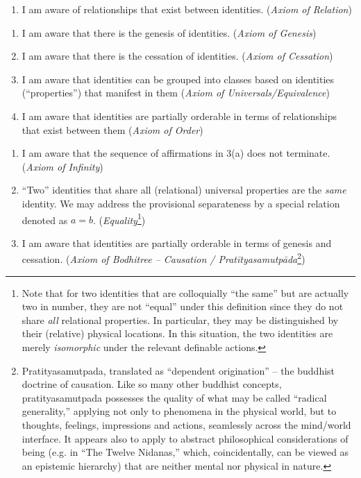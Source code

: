 \documentclass[pra,twocolumn,groupedaddress,10pt]{revtex4}
\theoremstyle{definition}
\begin{document}
\begin{enumerate}[label={[\textbf{\arabic*}]},start=0]
\begin{enumerate}
			\item I am aware of relationships that exist between identities. (\emph{Axiom of Relation})
		\end{enumerate}
	\item \begin {enumerate}
			\item I am aware that there is the genesis of identities. (\emph{Axiom of Genesis})
			\item I am aware that there is the cessation of identities. (\emph{Axiom of Cessation})
			\item I am aware that identities can be grouped into classes based on identities (``properties'') that manifest in them (\emph{Axiom of Universals/Equivalence})
			\item I am aware that identities are partially orderable in terms of relationships that exist between them (\emph{Axiom of Order})
		\end{enumerate}
	\item \begin{enumerate}
			\item I am aware that the sequence of affirmations in 3(a) does not terminate. (\emph{Axiom of Infinity})
			\item ``Two'' identities that share all (relational) universal properties are the \emph{same} identity. We may address the provisional separateness by a special relation denoted as $a = b$. (\emph{Equality}\footnote{Note that for two identities that are colloquially ``the same'' but are actually two in number, they are not ``equal'' under this definition since they do not share \emph{all} relational properties. In particular, they may be distinguished by their (relative) physical locations. In this situation, the two identities are merely \emph{isomorphic} under the relevant definable actions.})
			\item I am aware that identities are partially orderable in terms of genesis and cessation. (\emph{Axiom of Bodhitree -- Causation / Prat\={i}tyasamutp\={a}da}\footnote{Pratityasamutpada, translated as ``dependent origination'' -- the buddhist doctrine of causation. Like so many other buddhist concepts, pratityasamutpada possesses the quality of what may be called ``radical generality,'' applying not only to phenomena in the physical world, but to thoughts, feelings, impressions and actions, seamlessly across the mind/world interface. It appears also to apply to abstract philosophical considerations of being (e.g. in ``The Twelve Nidanas,'' which, coincidentally, can be viewed as an epistemic hierarchy) that are neither mental nor physical in nature.})

\end{enumerate}
\end{enumerate}
\end{document}
